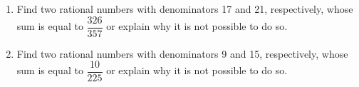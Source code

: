 \begin{enumerate}
\begin{enumerate}
\item Find two rational numbers with denominators 17 and 21, respectively, whose sum is equal to 
$\dfrac{326}{357}$ or explain why it is not possible to do so.

\item Find two rational numbers with denominators 9 and 15, respectively, whose sum is equal to 
$\dfrac{10}{225}$ or explain why it is not possible to do so.

\end{enumerate}


%
%
%
\end{enumerate}


